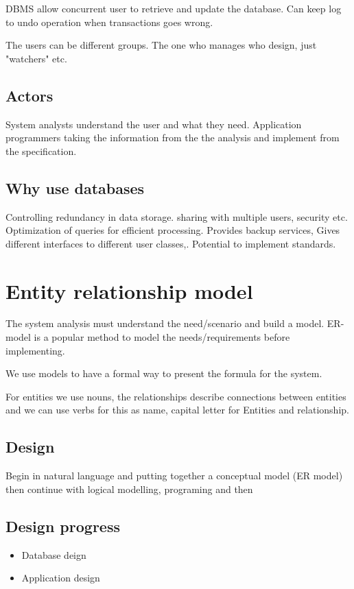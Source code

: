 \documentclass[a4paper]{article}
\begin{document}
DBMS allow concurrent user to retrieve and update the database. Can keep log to undo operation when transactions goes wrong. 

The users can be different groups. The one who manages who design, just "watchers"  etc. 

\subsection*{Actors}
System analysts understand the user and what they need. Application programmers taking the information from the the analysis and implement from the specification. 

\subsection*{Why use databases}
Controlling redundancy in data storage. sharing with multiple users, security etc.
Optimization of queries for efficient processing. Provides backup services, Gives different interfaces to different user classes,.
Potential to implement standards.

\section*{Entity relationship model}
The system analysis must understand the need/scenario and build a model. ER-model is a popular method to model the needs/requirements before implementing.

We use models to have a formal way to present the formula for the system. 

For entities we use nouns, the relationships describe connections between entities and we can use verbs for this as name, capital letter for Entities and relationship. 

\subsection*{Design}
Begin in natural language and putting together a conceptual model (ER model) then continue with logical modelling, programing and then  

\subsection*{Design progress}
\begin{itemize}
	\item Database deign
	\item Application design
\end{itemize}
\end{document}
